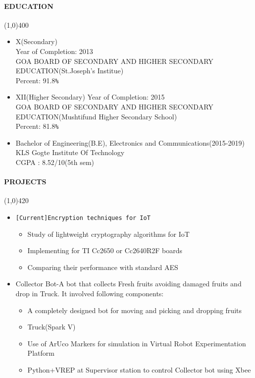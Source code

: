 \documentclass[12pt,a4paper]{article}
\begin{document}
\paragraph{EDUCATION}
	\line(1,0){400}
	\begin{itemize}
  		\item \textrm{X}(Secondary)\\
  			Year of Completion: 2013\\
			GOA BOARD OF SECONDARY AND HIGHER SECONDARY EDUCATION(St.Joseph's Institue)\\
			Percent: 91.8\verb"%"
  		\item \textrm{XII}(Higher Secondary)
  			Year of Completion: 2015\\
			GOA BOARD OF SECONDARY AND HIGHER SECONDARY EDUCATION(Mushtifund Higher Secondary School)\\
			Percent: 81.8\verb"%"
  		\item Bachelor of Engineering(B.E), Electronics and Communications(2015-2019)\\
  			  KLS Gogte Institute Of Technology\\
			  CGPA : 8.52/10(5th sem)
	\end{itemize}
\paragraph{PROJECTS}
	\line(1,0){420}
	\begin{itemize}
		\item \verb"[Current]Encryption techniques for IoT"
		\begin{itemize}
			\item Study of lightweight cryptography algorithms for IoT
			\item Implementing for TI Cc2650 or Cc2640R2F boards
			\item Comparing their performance with standard AES
		\end{itemize}
		\item Collector Bot-A bot that collects Fresh fruits avoiding damaged fruits and drop in Truck. It involved following components:
		\begin{itemize}
			\item A completely designed bot for moving and picking and dropping fruits
			\item Truck(Spark V)
			\item Use of ArUco Markers for simulation in Virtual Robot Experimentation Platform
			\item Python+VREP at Supervisor station to control Collector bot using Xbee\\
		\end{itemize}
	\end{itemize}
\end{document}
